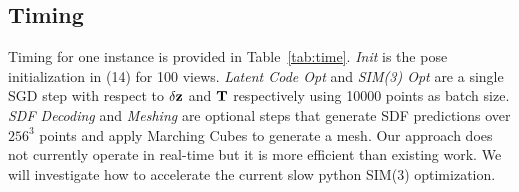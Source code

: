 \subsection*{Timing}

\begin{table}[tph!]
    \centering
    \caption{ELLIPSDF timing breakdown (sec)}
    \label{tab:time}
\end{table}

Timing for one instance is provided in Table~\ref{tab:time}. \textit{Init} is the pose initialization in (14) for 100 views. \textit{Latent Code Opt} and \textit{SIM(3) Opt} are a single SGD step with respect to $\delta \mathbf{z}$ and $\mathbf{T}$ respectively using 10000 points as batch size. \textit{SDF Decoding} and \textit{Meshing} are optional steps that generate SDF predictions over $256^3$ points and apply Marching Cubes to generate a mesh. Our approach does not currently operate in real-time but it is more efficient than existing work. We will investigate how to accelerate the current slow python SIM(3) optimization.


